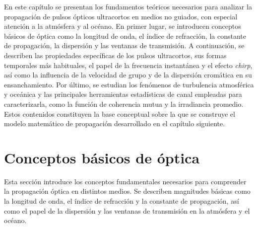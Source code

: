 \label{chp:ManLaTeX}
\minitoc

\begin{sinopsis}
\label{sec:chpltx:sinop}
En este capítulo se presentan los fundamentos teóricos necesarios para analizar la propagación de pulsos ópticos ultracortos en medios no guiados, con especial atención a la atmósfera y al océano. En primer lugar, se introducen conceptos básicos de óptica como la longitud de onda, el índice de refracción, la constante de propagación, la dispersión y las ventanas de transmisión. A continuación, se describen las propiedades específicas de los pulsos ultracortos, sus formas temporales más habituales, el papel de la frecuencia instantánea y el efecto \textit{chirp}, así como la influencia de la velocidad de grupo y de la dispersión cromática en su ensanchamiento. Por último, se estudian los fenómenos de turbulencia atmosférica y oceánica y las principales herramientas estadísticas de canal empleadas para caracterizarla, como la función de coherencia mutua y la irradiancia promedio. Estos contenidos constituyen la base conceptual sobre la que se construye el modelo matemático de propagación desarrollado en el capítulo siguiente.
\end{sinopsis}

\section{Conceptos básicos de óptica}
Esta sección introduce los conceptos fundamentales necesarios para comprender la propagación óptica en distintos medios. Se describen magnitudes básicas como la longitud de onda, el índice de refracción y la constante de propagación, así como el papel de la dispersión y las ventanas de transmisión en la atmósfera y el océano.

